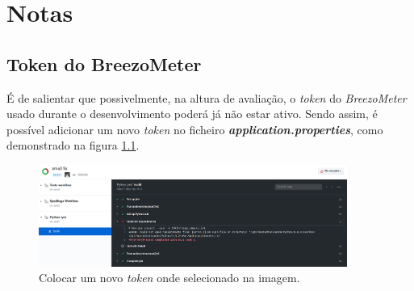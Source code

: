 
\chapter{Notas}

\section{Token do BreezoMeter}
É de salientar que possivelmente, na altura de avaliação, o \textit{token} do \textit{BreezoMeter} usado durante o desenvolvimento poderá já não estar ativo. Sendo assim, é possível adicionar um novo \textit{token} no ficheiro \textbf{\textit{application.properties}}, como demonstrado na figura \ref{fig:properties}.

\begin{figure}[h]
   \centering
   \includegraphics[width=0.90\textwidth]{images/logs}
   \caption{Colocar um novo \textit{token} onde selecionado na imagem.}
   \label{fig:properties}
\end{figure}
